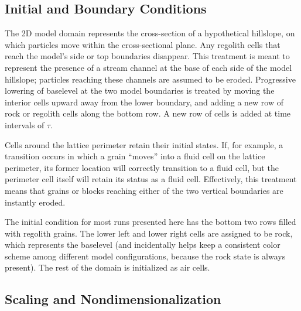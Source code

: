 \documentclass[esurf, manuscript]{copernicus}
\begin{document}
\subsection{Initial and Boundary Conditions}

The 2D model domain represents the cross-section of a hypothetical hillslope, on which particles move within the cross-sectional plane. Any regolith cells that reach the model's side or top boundaries disappear. This treatment is meant to represent the presence of a stream channel at the base of each side of the model hillslope; particles reaching these channels are assumed to be eroded. Progressive lowering of baselevel at the two model boundaries is treated by moving the interior cells upward away from the lower boundary, and adding a new row of rock or regolith cells along the bottom row. A new row of cells is added at time intervals of $\tau$.

Cells around the lattice perimeter retain their initial states. If, for example, a transition occurs in which a grain ``moves'' into a fluid cell on the lattice perimeter, its former location will correctly transition to a fluid cell, but the perimeter cell itself will retain its status as a fluid cell. Effectively, this treatment means that grains or blocks reaching either of the two vertical boundaries are instantly eroded.

The initial condition for most runs presented here has the bottom two rows filled with regolith grains. The lower left and lower right cells are assigned to be rock, which represents the baselevel (and incidentally helps keep a consistent color scheme among different model configurations, because the rock state is always present). The rest of the domain is initialized as air cells.

\subsection{Scaling and Nondimensionalization}
\end{document}
